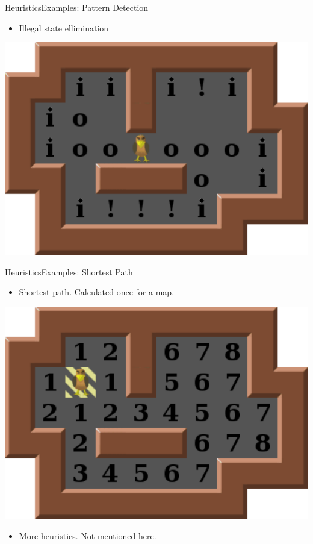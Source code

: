 \begin{frame}{Heuristics}{Examples: Pattern Detection}
  \begin{itemize}
  \item Illegal state ellimination
  \end{itemize}
  \begin{center}
    \includegraphics[height=0.7\textheight]{cornermarkings.pdf}
  \end{center}
\end{frame}

\begin{frame}{Heuristics}{Examples: Shortest Path}
  \begin{itemize}
  \item Shortest path. Calculated once for a map.
  \end{itemize}
  \begin{center}
    \includegraphics[height=0.5\textheight]{distances.pdf}
  \end{center}
  \begin{itemize}
  \item More heuristics. Not mentioned here.
  \end{itemize}
\end{frame}


